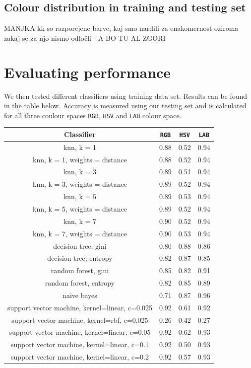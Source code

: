 \documentclass[12pt,a4paper]{article}
\begin{document}
	\subsection{Colour distribution in training and testing set}

	MANJKA kk so razporejene barve, kaj smo nardili za enakomernost oziroma zakaj se za njo nismo odločli - A BO TU AL ZGORI

	\section{Evaluating performance}

	We then tested different classifiers using training data set. Results can be found in the table below. Accuracy is measured using our testing set and is calculated for all three coulour spaces \texttt{RGB}, \texttt{HSV} and \texttt{LAB} colour space.

	
	\begin{center}
		\begin{tabular}{|c|c|c|c|}
			\hline 
			\textbf{Classifier} & \texttt{RGB} & \texttt{HSV} & \texttt{LAB} \\
			\hline
			knn, k = 1 & 0.88 & 0.52 & 0.94 \\ \hline
			knn, k = 1, weights = distance & 0.88 & 0.52 & 0.94 \\ \hline
			knn, k = 3 & 0.89 & 0.51 & 0.94 \\ \hline
			knn, k = 3, weights = distance & 0.89 & 0.52 & 0.94 \\ \hline
			knn, k = 5 & 0.89 & 0.53 & 0.94 \\ \hline
			knn, k = 5, weights = distance & 0.89 & 0.52 & 0.94 \\ \hline
			knn, k = 7 & 0.90 & 0.52 & 0.94 \\ \hline
			knn, k = 7, weights = distance & 0.90 & 0.53 & 0.94 \\ \hline
			decision tree, gini & 0.80 & 0.88 & 0.86 \\ \hline
			decision tree, entropy & 0.82 & 0.87 & 0.85 \\ \hline
			random forest, gini & 0.85 & 0.82 & 0.91 \\ \hline
			random forest, entropy & 0.82 & 0.85 & 0.89 \\ \hline
			naive bayes & 0.71 & 0.87 & 0.96 \\ \hline
			support vector machine, kernel=linear, c=0.025 & 0.92 & 0.61 & 0.92 \\ \hline
			support vector machine, kernel=rbf, c=0.025 & 0.26 & 0.42 & 0.27 \\ \hline
			support vector machine, kernel=linear, c=0.05 & 0.92 & 0.62 & 0.93 \\ \hline
			support vector machine, kernel=linear, c=0.1 & 0.92 & 0.50 & 0.93 \\ \hline
			support vector machine, kernel=linear, c=0.2 & 0.92 & 0.57 & 0.93 \\ \hline
		\end{tabular} \\
	\end{center}
\end{document}

